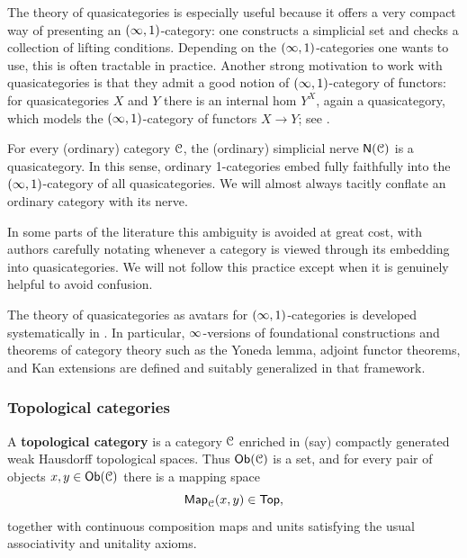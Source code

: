 \begin{observation}
  The theory of quasicategories is especially useful because it offers a very
  compact way of presenting an $(\operatorname{\infty},1)$-category: one constructs a simplicial
  set and checks a collection of lifting conditions.  Depending on the
  $(\operatorname{\infty},1)$-categories one wants to use, this is often tractable in practice.
  Another strong motivation to work with quasicategories is that they admit a
  good notion of $(\operatorname{\infty},1)$-category of functors: for quasicategories $X$ and
  $Y$ there is an internal hom $Y^{X}$, again a quasicategory, which models
  the $(\operatorname{\infty},1)$-category of functors $X \to Y$; see \cite[§1.2.7]{HTT}.
\end{observation}

\begin{remark}
  For every (ordinary) category $\mathcal C$, the (ordinary) simplicial nerve
  $\mathsf N(\mathcal C)$ is a quasicategory.  In this sense, ordinary 1-categories embed
  fully faithfully into the $(\operatorname{\infty},1)$-category of all quasicategories.  We
  will almost always tacitly conflate an ordinary category with its nerve.
\end{remark}

\begin{warning}
  In some parts of the literature this ambiguity is avoided at great cost,
  with authors carefully notating whenever a category is viewed through its
  embedding into quasicategories.  We will not follow this practice except
  when it is genuinely helpful to avoid confusion.
\end{warning}

\medskip

The theory of quasicategories as avatars for $(\operatorname{\infty},1)$-categories is developed
systematically in \cite{HTT}.  In particular, $\operatorname{\infty}$-versions of foundational
constructions and theorems of category theory such as the Yoneda lemma,
adjoint functor theorems, and Kan extensions are defined and suitably
generalized in that framework.

\subsubsection{Topological categories}

\begin{definition}
  A \textbf{topological category} is a category $\mathcal C$ enriched in (say)
  compactly generated weak Hausdorff topological spaces.  Thus $\operatorname{{\sf Ob}}(\mathcal C)$ is
  a set, and for every pair of objects $x,y \in \operatorname{{\sf Ob}}(\mathcal C)$ there is a mapping
  space
  \[
    \operatorname{{\sf Map}}_{\mathcal C}(x,y) \in \operatorname{\mathsf{Top}},
  \]
  together with continuous composition maps and units satisfying the usual
  associativity and unitality axioms.
\end{definition}

